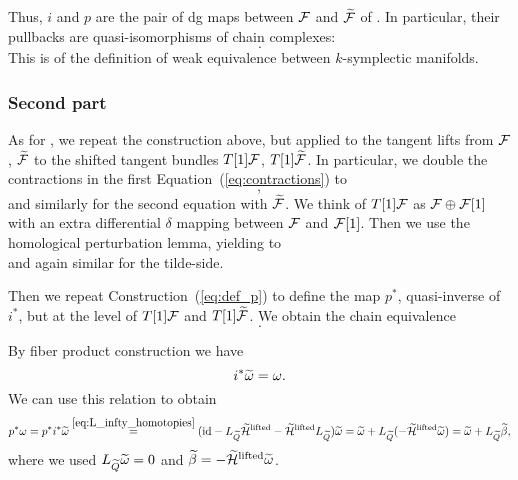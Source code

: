Thus, $i$ and $p$ are the pair of dg maps between $\mathcal{F}$ and $\widetilde{\mathcal{F}}$ of .
In particular, their pullbacks are quasi-isomorphisms of chain complexes:
\begin{equation}
     .
\end{equation}
This is  of the definition of weak equivalence between $k$-symplectic manifolds.

\subsubsection{Second part}
\label{subsubsec:second_part}

As for , we repeat the construction above, but applied to the tangent lifts from $\mathcal{F}$, $\widetilde{\mathcal{F}}$ to the shifted tangent bundles $T[1]\mathcal{F}$, $T[1]\widetilde{\mathcal{F}}$.
In particular, we double the contractions in the first Equation~(\ref{eq:contractions}) to
\begin{equation}
    ,
\end{equation}
and similarly for the second equation with $\widetilde{\mathcal{F}}$.
We think of $T[1]\mathcal{F}$ as $\mathcal{F} \oplus \mathcal{F}[1]$ with an extra differential $\delta$ mapping between $\mathcal{F}$ and $\mathcal{F}[1]$.
Then we use the homological perturbation lemma, yielding to
\begin{equation}
    
\end{equation}
and again similar for the tilde-side.

Then we repeat Construction~(\ref{eq:def_p}) to define the map $p^*$, quasi-inverse of $i^*$, but at the level of $T[1]\mathcal{F}$ and $T[1]\widetilde{\mathcal{F}}$.
We obtain the chain equivalence
\begin{equation}
\label{eq:maps_sketch_proof_part_b}
     .
\end{equation}

By fiber product construction we have 
\begin{equation*}
    i^* \widetilde{\omega} = \omega .
\end{equation*}
We can use this relation to obtain
\begin{equation*}
    p^* \omega =
    p^* i^* \widetilde{\omega}
    \stackrel{\ref{eq:L_infty_homotopies}}{=}
    (\text{id} - L_{\widetilde{Q}} \widetilde{\mathcal{H}}^\text{lifted} - \widetilde{\mathcal{H}}^\text{lifted} L_{\widetilde{Q}}) \widetilde{\omega} =
    \widetilde{\omega} + L_{\widetilde{Q}} (- \widetilde{\mathcal{H}}^\text{lifted} \widetilde{\omega}) =
    \widetilde{\omega} + L_{\widetilde{Q}} \widetilde{\beta},
\end{equation*}
where we used $L_{\widetilde{Q}} \widetilde{\omega}=0$ and $\widetilde{\beta}=- \widetilde{\mathcal{H}}^\text{lifted} \widetilde{\omega}$.

